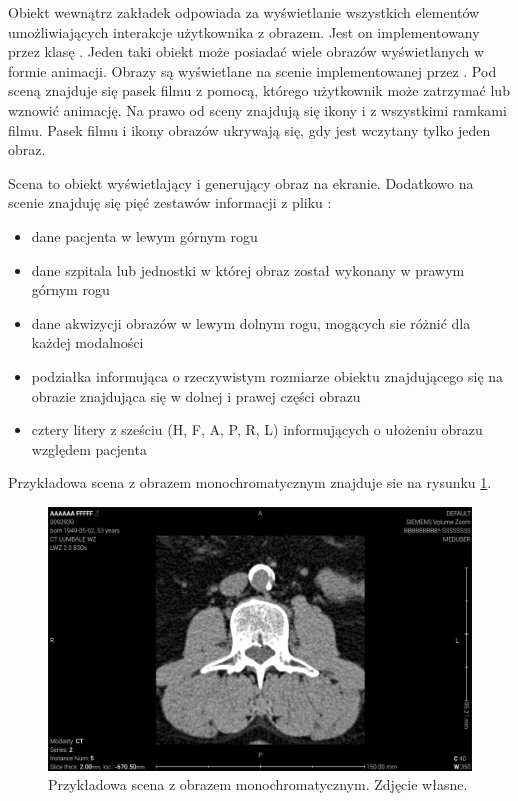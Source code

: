 \par
Obiekt wewnątrz zakładek odpowiada za wyświetlanie wszystkich elementów umożliwiających interakcje użytkownika z obrazem.
Jest on implementowany przez klasę .
Jeden taki obiekt może posiadać wiele obrazów wyświetlanych w formie animacji.
Obrazy są wyświetlane na scenie implementowanej przez .
Pod sceną znajduje się pasek filmu z pomocą, którego użytkownik może zatrzymać lub wznowić animację.
Na prawo od sceny znajdują się ikony i z wszystkimi ramkami filmu.
Pasek filmu i ikony obrazów ukrywają się, gdy jest wczytany tylko jeden obraz.
\par
Scena to obiekt wyświetlający i generujący obraz na ekranie.
Dodatkowo na scenie znajduję się pięć zestawów informacji z pliku \DICOM:
\begin{itemize}
    \item dane pacjenta w lewym górnym rogu
    \item dane szpitala lub jednostki w której obraz został wykonany w prawym górnym rogu
    \item dane akwizycji obrazów w lewym dolnym rogu, mogących sie różnić dla każdej modalności
    \item podziałka informująca o rzeczywistym rozmiarze obiektu znajdującego się na obrazie znajdująca się w dolnej i prawej części obrazu
    \item cztery litery z sześciu (H, F, A, P, R, L) informujących o ułożeniu obrazu względem pacjenta
\end{itemize}
Przykładowa scena z obrazem monochromatycznym znajduje sie na rysunku \ref{fig:sokar-gui-scene}.

\begin{figure}[!htbp]
    \centering
    \includegraphics[width=\textwidth]{img/sokar-gui-003.png}
    \caption{Przykładowa scena z obrazem monochromatycznym. Zdjęcie własne.}
    \label{fig:sokar-gui-scene}
\end{figure}


